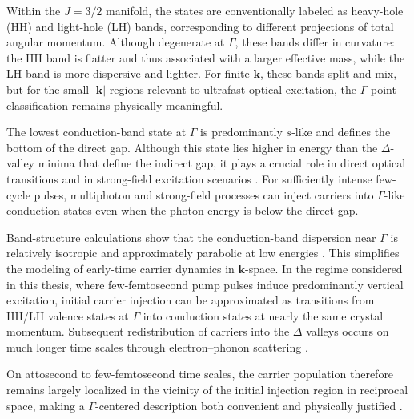 Within the $J=3/2$ manifold, the states are conventionally labeled as heavy-hole (HH) and light-hole (LH) bands, corresponding to different projections of total angular momentum. Although degenerate at $\Gamma$, these bands differ in curvature: the HH band is flatter and thus associated with a larger effective mass, while the LH band is more dispersive and lighter. For finite $\mathbf{k}$, these bands split and mix, but for the small-$|\mathbf{k}|$ regions relevant to ultrafast optical excitation, the $\Gamma$-point classification remains physically meaningful.

The lowest conduction-band state at $\Gamma$ is predominantly $s$-like and defines the bottom of the direct gap. Although this state lies higher in energy than the $\Delta$-valley minima that define the indirect gap, it plays a crucial role in direct optical transitions and in strong-field excitation scenarios \cite{Robertson01011983}. For sufficiently intense few-cycle pulses, multiphoton and strong-field processes can inject carriers into $\Gamma$-like conduction states even when the photon energy is below the direct gap.

Band-structure calculations show that the conduction-band dispersion near $\Gamma$ is relatively isotropic and approximately parabolic at low energies \cite{PhysRevB.14.556,Benchmarking}. This simplifies the modeling of early-time carrier dynamics in $\mathbf{k}$-space. In the regime considered in this thesis, where few-femtosecond pump pulses induce predominantly vertical excitation, initial carrier injection can be approximated as transitions from HH/LH valence states at $\Gamma$ into conduction states at nearly the same crystal momentum. Subsequent redistribution of carriers into the $\Delta$ valleys occurs on much longer time scales through electron–phonon scattering \cite{Bernardi2014,Marini2013}. 

On attosecond to few-femtosecond time scales, the carrier population therefore remains largely localized in the vicinity of the initial injection region in reciprocal space, making a $\Gamma$-centered description both convenient and physically justified \cite{Schultze2014Si}.






